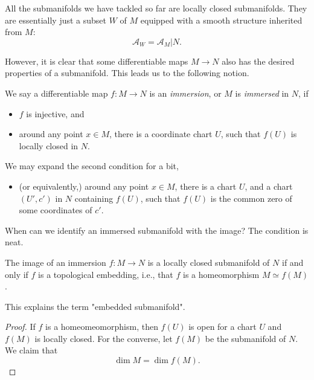 All the submanifolds we have tackled so far are locally closed submanifolds. They are essentially just a subset $W$ of $M$ equipped with a smooth structure inherited from $M$:
$$\mathcal{A}_W=\mathcal{A}_M|N.$$

However, it is clear that some differentiable maps $M\to N$ also has the desired properties of a submanifold. This leads us to the following notion.

\begin{definition}
    We say a differentiable map $f:M\to N$ is an \emph{immersion}, or $M$ is \emph{immersed} in $N$, if
    \begin{itemize}
        \item $f$ is injective, and
        \item around any point $x\in M$, there is a coordinate chart $U$, such that $f(U)$ is locally closed in $N$.
    \end{itemize}
    We may expand the second condition for a bit, 
    \begin{itemize}
        \item (or equivalently,) around any point $x\in M$, there is a chart $U$, and a chart $(U',c')$ in $N$ containing $f(U)$, such that $f(U)$ is the common zero of some coordinates of $c'$.
    \end{itemize}
\end{definition}

When can we identify an immersed submanifold with the image? The condition is neat.

\begin{proposition}
    The image of an immersion $f:M\to N$ is a locally closed submanifold of $N$ if and only if $f$ is a topological embedding, i.e., that $f$ is a homeomorphism $M\simeq f(M)$.

    This explains the term "embedded submanifold".
\end{proposition}

\begin{proof}
     If $f$ is a homeomeomorphism, then $f(U)$ is open for a chart $U$ and $f(M)$ is locally closed. For the converse, let $f(M)$ be the submanifold of $N$. We claim that
     $$\dim M=\dim f(M).$$
    
\end{proof}